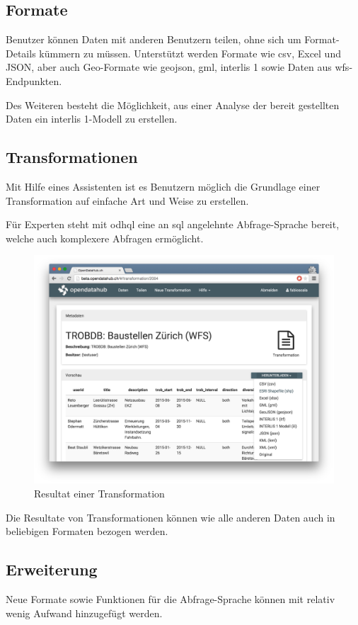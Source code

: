 \subsection*{Formate}
Benutzer können Daten mit anderen Benutzern teilen, ohne sich um Format-Details kümmern zu müssen. Unterstützt werden Formate wie \acs{csv}, Excel und JSON, aber auch Geo-Formate wie \gls{geojson}, \acs{gml}, \gls{interlis} 1 sowie Daten aus \gls{wfs}-Endpunkten.

Des Weiteren besteht die Möglichkeit, aus einer Analyse der bereit gestellten Daten ein \gls{interlis} 1-Modell zu erstellen.

\subsection*{Transformationen}
Mit Hilfe eines Assistenten ist es Benutzern möglich die Grundlage einer Transformation auf einfache Art und Weise zu erstellen. 

Für Experten steht mit \gls{odhql} eine an \acs{sql} angelehnte Abfrage-Sprache bereit, welche auch komplexere Abfragen ermöglicht.

\begin{figure}[H]
    \centering
    \includegraphics[width=0.8\linewidth]{fig/transformation-detail}
    \vspace{-0.5cm}\caption*{Resultat einer Transformation}
\end{figure}

Die Resultate von Transformationen können wie alle anderen Daten auch in beliebigen Formaten bezogen werden.

\subsection*{Erweiterung}
Neue Formate sowie Funktionen für die Abfrage-Sprache können mit relativ wenig Aufwand hinzugefügt werden.

